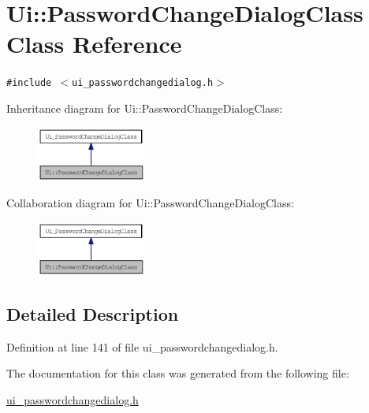\hypertarget{class_ui_1_1_password_change_dialog_class}{
\section{Ui::PasswordChangeDialogClass Class Reference}
\label{class_ui_1_1_password_change_dialog_class}
}
{\tt \#include $<$ui\_\-passwordchangedialog.h$>$}

Inheritance diagram for Ui::PasswordChangeDialogClass:\nopagebreak
\begin{figure}[H]
\begin{center}
\leavevmode
\includegraphics[width=101pt]{class_ui_1_1_password_change_dialog_class__inherit__graph}
\end{center}
\end{figure}
Collaboration diagram for Ui::PasswordChangeDialogClass:\nopagebreak
\begin{figure}[H]
\begin{center}
\leavevmode
\includegraphics[width=101pt]{class_ui_1_1_password_change_dialog_class__coll__graph}
\end{center}
\end{figure}


\subsection{Detailed Description}


Definition at line 141 of file ui\_\-passwordchangedialog.h.

The documentation for this class was generated from the following file:\begin{CompactItemize}
\item 
\hyperlink{ui__passwordchangedialog_8h}{ui\_\-passwordchangedialog.h}\end{CompactItemize}
